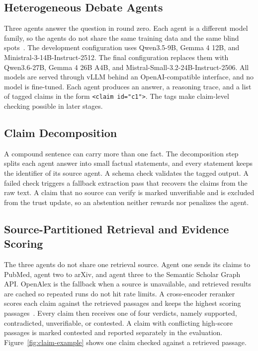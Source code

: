 \documentclass[a4paper,fleqn]{cas-sc}
\begin{document}
\subsection{Heterogeneous Debate Agents}
Three agents answer the question in round zero. Each agent is a different model family, so the agents do not share the same training data and the same blind spots~\cite{estornell2024multillm}. The development configuration uses Qwen3.5-9B, Gemma 4 12B, and Ministral-3-14B-Instruct-2512. The final configuration replaces them with Qwen3.6-27B, Gemma 4 26B A4B, and Mistral-Small-3.2-24B-Instruct-2506. All models are served through vLLM behind an OpenAI-compatible interface, and no model is fine-tuned. Each agent produces an answer, a reasoning trace, and a list of tagged claims in the form \texttt{<claim id="c1">}. The tags make claim-level checking possible in later stages.

\subsection{Claim Decomposition}
A compound sentence can carry more than one fact. The decomposition step splits each agent answer into small factual statements, and every statement keeps the identifier of its source agent. A schema check validates the tagged output. A failed check triggers a fallback extraction pass that recovers the claims from the raw text. A claim that no source can verify is marked unverifiable and is excluded from the trust update, so an abstention neither rewards nor penalizes the agent.

\subsection{Source-Partitioned Retrieval and Evidence Scoring}
The three agents do not share one retrieval source. Agent one sends its claims to PubMed, agent two to arXiv, and agent three to the Semantic Scholar Graph API. OpenAlex is the fallback when a source is unavailable, and retrieved results are cached so repeated runs do not hit rate limits. A cross-encoder reranker scores each claim against the retrieved passages and keeps the highest scoring passages~\cite{karpukhin2020dense}. Every claim then receives one of four verdicts, namely supported, contradicted, unverifiable, or contested. A claim with conflicting high-score passages is marked contested and reported separately in the evaluation. Figure~\ref{fig:claim-example} shows one claim checked against a retrieved passage.
\end{document}
